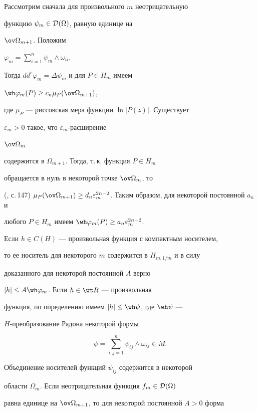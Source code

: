 \begin{pf}


Рассмотрим сначала для произвольного $m$ неотрицательную 


функцию $\psi_m\in{\cal D}(\Omega)$, равную единице на


$\ov\Omega_{m+1}$. Положим 


$\varphi_m=\sum\limits_{i=1}^n\psi_m\wedge\omega_{ii}$.


Тогда $dd^c\varphi_m=\Delta\psi_m$ и для $P\in H_m$ имеем 


$\wh\varphi_m(P)\ge c_n\mu_P(\ov\Omega_{m+1})$,


где $\mu_P$ --- риссовская мера функции $\ln|P(z)|$. Существует 


$\varepsilon_m>0$ такое, что $\varepsilon_m$-расширение


 $\ov\Omega_m$ 


содержится в  $\Omega_{m+1}$. Тогда, т.\,к. функция $P\in H_m$ 


обращается в нуль в некоторой точке $\ov\Omega_m$, то 


(\cite{Chirk1}, с.\,147) $\mu_P(\ov\Omega_{m+1})\ge 


d_n\varepsilon_m^{2n-2}$. Таким образом, для некоторой постоянной $a_n$ и 


любого $P\in H_m$ имеем $\wh\varphi_m(P)\ge a_n \varepsilon_m^{2n-2}$. 


Если $h\in C(H)$ --- произвольная функция с компактным носителем, 


то ее носитель для некоторого $m$ содержится в $H_{m,1/m}$ и в силу 


доказанного для некоторой постоянной $A$ верно


$|h|\le A\wh\varphi_m$. Если $h\in\wt R$ --- произвольная 


функция, по определению имеем $|h|\le \wh\psi$, где $\wh\psi$ --- 


$H$-преобразование Радона некоторой формы 


$$


\psi=\sum\limits_{i,j=1}^n\psi_{ij}\wedge\omega_{ij}\in M.


$$


Объединение носителей функций $\psi_{ij}$ содержится в некоторой 


области $\Omega_m$. Если неотрицательная функция $f_m\in{\cal D}(\Omega)$


равна единице на $\ov\Omega_{m+1}$, то для некоторой постоянной $A>0$ форма



\end{pf}
